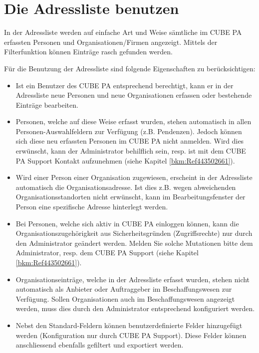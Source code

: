 
\clearpage
\section{Die Adressliste benutzen}
\label{bkm:Ref443738751}
In der Adressliste werden auf einfache Art und Weise sämtliche im CUBE PA erfassten Personen und Organisationen/Firmen angezeigt. Mittels der Filterfunktion können Einträge rasch gefunden werden.

\vspace{\baselineskip}

Für die Benutzung der Adressliste sind folgende Eigenschaften zu berücksichtigen:

\begin{itemize}
\item
Ist ein Benutzer des CUBE PA entsprechend berechtigt, kann er in der Adressliste neue Personen und neue Organisationen erfassen oder bestehende Einträge bearbeiten.

\item
Personen, welche auf diese Weise erfasst wurden, stehen automatisch in allen Personen-Auswahlfeldern zur Verfügung (z.B. Pendenzen). Jedoch können sich diese neu erfassten Personen im CUBE PA nicht anmelden. Wird dies erwünscht, kann der Administrator behilflich sein, resp. ist mit dem CUBE PA Support Kontakt aufzunehmen (siehe Kapitel
\ref{bkm:Ref443502661}).

\item
Wird einer Person einer Organisation zugewiesen, erscheint in der Adressliste automatisch die Organisationsadresse. Ist dies z.B. wegen abweichenden Organisationsstandorten nicht erwünscht, kann im Bearbeitungsfenster der Person eine spezifische Adresse hinterlegt werden.

\item
Bei Personen, welche sich aktiv in CUBE PA einloggen können, kann die Organisationszugehörigkeit aus Sicherheitsgründen (Zugriffsrechte) nur durch den Administrator geändert werden. Melden Sie solche Mutationen bitte dem Administrator, resp. dem CUBE PA Support (siehe Kapitel \ref{bkm:Ref443502661}).

\item
Organisationseinträge, welche in der Adressliste erfasst wurden, stehen nicht automatisch als Anbieter oder Auftraggeber im Beschaffungswesen zur Verfügung. Sollen Organisationen auch im Beschaffungswesen angezeigt werden, muss dies durch den Administrator entsprechend konfiguriert werden.

\item
Nebst den Standard-Feldern können benutzerdefinierte Felder hinzugefügt werden (Konfiguration nur durch CUBE PA Support). Diese Felder können anschliessend ebenfalls gefiltert und exportiert werden.

\end{itemize}

